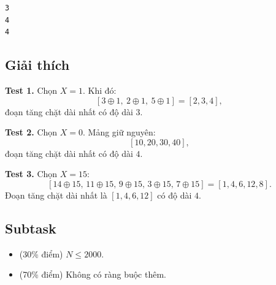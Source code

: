 \begin{verbatim}
3
4
4
\end{verbatim}

\subsection*{Giải thích}

\textbf{Test 1.}  
Chọn $X = 1$. Khi đó:
\[
[3 \oplus 1,\ 2 \oplus 1,\ 5 \oplus 1] = [2,3,4],
\]
đoạn tăng chặt dài nhất có độ dài $3$.

\textbf{Test 2.}  
Chọn $X = 0$. Mảng giữ nguyên:
\[
[10,20,30,40],
\]
đoạn tăng chặt dài nhất có độ dài $4$.

\textbf{Test 3.}  
Chọn $X = 15$:
\[
[14\oplus 15,\, 11\oplus 15,\, 9\oplus 15,\, 3\oplus 15,\, 7\oplus 15]
= [1,4,6,12,8].
\]
Đoạn tăng chặt dài nhất là $[1,4,6,12]$ có độ dài $4$.

\subsection*{Subtask}

\begin{itemize}
  \item (30\% điểm) $N \le 2000$.
  \item (70\% điểm) Không có ràng buộc thêm.
\end{itemize}
